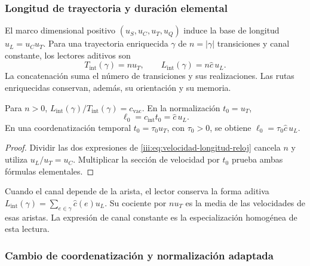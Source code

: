 \subsubsection{Longitud de trayectoria y duración elemental}

El marco dimensional positivo $(u_S,u_C,u_T,u_Q)$ induce la base de
longitud $u_L=u_Cu_T$. Para una trayectoria enriquecida $\gamma$ de
$n=|\gamma|$ transiciones y canal constante, los lectores aditivos son
\begin{equation}
 T_{\mathrm{int}}(\gamma)=nu_T,
 \qquad L_{\mathrm{int}}(\gamma)=n\widehat c\,u_L.
 \label{iii:eq:velocidad-longitud-reloj}
\end{equation}
La concatenación suma el número de transiciones y sus realizaciones.
Las rutas enriquecidas conservan, además, su orientación y su memoria.

\begin{corollary}
Para $n>0$, $L_{\mathrm{int}}(\gamma)/T_{\mathrm{int}}(\gamma)
=c_{\mathrm{vac}}$. En la normalización $t_0=u_T$,
\begin{equation}
 \ell_0=c_{\mathrm{int}}t_0=\widehat c\,u_L.
 \label{iii:eq:longitud-elemental-constitutiva}
\end{equation}
En una coordenatización temporal $t_0=\tau_0u_T$, con $\tau_0>0$, se obtiene
$\ell_0=\tau_0\widehat c\,u_L$.
\end{corollary}
\begin{proof}
Dividir las dos expresiones de \eqref{iii:eq:velocidad-longitud-reloj}
cancela $n$ y utiliza $u_L/u_T=u_C$. Multiplicar la sección de velocidad
por $t_0$ prueba ambas fórmulas elementales.
\end{proof}

Cuando el canal depende de la arista, el lector conserva la forma aditiva
$L_{\mathrm{int}}(\gamma)=\sum_{e\in\gamma}\widehat c(e)u_L$.
Su cociente por $nu_T$ es la media de las velocidades de esas aristas.
La expresión de canal constante es la especialización homogénea de
esta lectura.

\subsubsection{Cambio de coordenatización y normalización adaptada}

